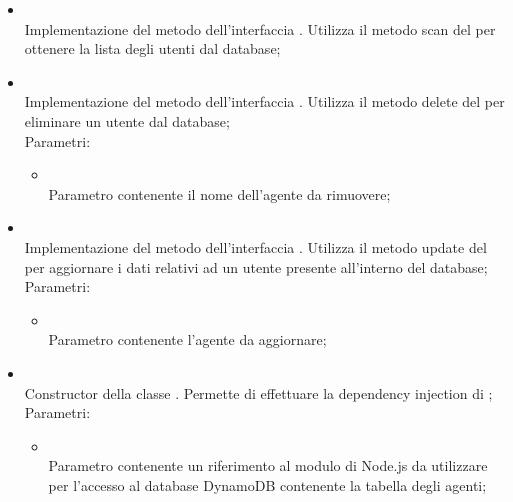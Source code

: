 \begin{itemize}
\begin{itemize}
		\item[]  \\
		Implementazione del metodo dell'interfaccia . Utilizza il metodo scan del  per ottenere la lista degli utenti dal database;\\
		\item[]  \\
		Implementazione del metodo dell'interfaccia . Utilizza il metodo delete del  per eliminare un utente dal database;\\
		Parametri:
		\begin{itemize}
			\item {} \\
			Parametro contenente il nome dell'agente da rimuovere;
		\end{itemize}
		\item[]  \\
		Implementazione del metodo dell'interfaccia . Utilizza il metodo update del  per aggiornare i dati relativi ad un utente presente all'interno del database;\\
		Parametri:
		\begin{itemize}
			\item {} \\
			Parametro contenente l'agente da aggiornare;
		\end{itemize}
		\item[]  \\
		Constructor della classe . Permette di effettuare la dependency injection di ;\\
		Parametri:
		\begin{itemize}
			\item {} \\
			Parametro contenente un riferimento al modulo di Node.js da utilizzare per l'accesso al database DynamoDB contenente la tabella degli agenti;
		\end{itemize}
	\end{itemize}
\end{itemize}
\FloatBarrier

